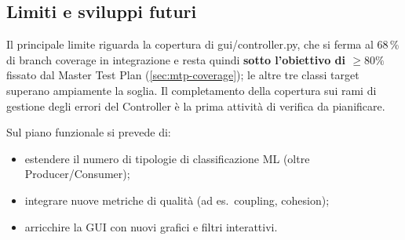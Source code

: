 \documentclass[11pt,a4paper]{article}
\makeatletter
\newif\ifmark@prevlower
\def\mark@casebreak#1{%
  \ifcat\noexpand#1\relax
    \mark@prevlowerfalse
  \else
    \ifnum`#1=\uccode`#1\relax
      \ifmark@prevlower\allowbreak\fi
      \mark@prevlowerfalse
    \else
      \ifnum`#1=\lccode`#1\relax
        \mark@prevlowertrue
      \else
        \mark@prevlowerfalse
      \fi
    \fi
  \fi}
\def\mark@brk#1{%
  \ifx#1\mark@stop
    \let\mark@next\relax
  \else
    \mark@casebreak{#1}%
    #1%
    \ifx#1.\allowbreak\else
      \ifx#1\_\allowbreak\else
        \ifx#1/\allowbreak\else
          \ifx#1(\allowbreak\fi
        \fi
      \fi
    \fi
    \let\mark@next\mark@brk
  \fi
  \mark@next}
\def\mark@stop{\mark@stop}
\DeclareRobustCommand{\mark@code}[1]{%
  \ifmmode
    \text{\ttfamily\small\mark@prevlowerfalse\mark@brk#1\mark@stop}%
  \else
    {\ttfamily\small\mark@prevlowerfalse\mark@brk#1\mark@stop}%
  \fi}
\DeclareRobustCommand{\pkgpath}[1]{\mark@code{#1}}
\def\mark@code#1{#1}%
\def\pkgpath#1{#1}%
\makeatother
\begin{document}
\subsection{Limiti e sviluppi futuri}
\label{sec:futuri}

Il principale limite riguarda la copertura di \pkgpath{gui/controller.py}, che
si ferma al 68\,\% di branch coverage in integrazione e resta quindi
\textbf{sotto l'obiettivo di $\geq 80\%$} fissato dal Master Test Plan
(\cref{sec:mtp-coverage}); le altre tre classi target superano ampiamente la
soglia. Il completamento della copertura sui rami di gestione degli errori del
Controller \`e la prima attivit\`a di verifica da pianificare.

Sul piano funzionale si prevede di:

\begin{itemize}[nosep]
  \item estendere il numero di tipologie di classificazione ML (oltre
    Producer/Consumer);
  \item integrare nuove metriche di qualit\`a (ad es.\ coupling, cohesion);
  \item arricchire la GUI con nuovi grafici e filtri interattivi.
\end{itemize}

\clearpage
\printbibliography[heading=bibnumbered,title={Riferimenti bibliografici}]
\end{document}
